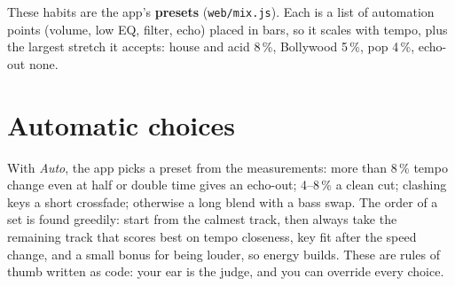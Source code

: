 These habits are the app's \textbf{presets} (\texttt{web/mix.js}). Each is a list of automation points (volume, low EQ, filter, echo) placed in bars, so it scales with tempo, plus the largest stretch it accepts: house and acid 8\,\%, Bollywood 5\,\%, pop 4\,\%, echo-out none.

\section{Automatic choices}
With \emph{Auto}, the app picks a preset from the measurements: more than 8\,\% tempo change even at half or double time gives an echo-out; 4--8\,\% a clean cut; clashing keys a short crossfade; otherwise a long blend with a bass swap. The order of a set is found greedily: start from the calmest track, then always take the remaining track that scores best on tempo closeness, key fit after the speed change, and a small bonus for being louder, so energy builds. These are rules of thumb written as code: your ear is the judge, and you can override every choice.
